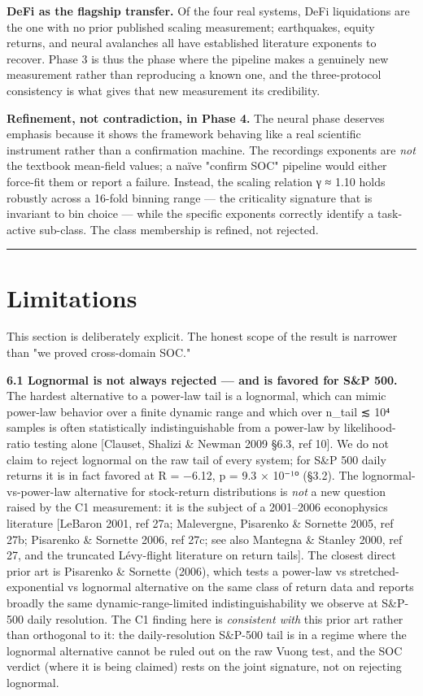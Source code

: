 \documentclass[
  11pt]{article}
\begin{document}
\textbf{DeFi as the flagship transfer.} Of the four real systems, DeFi
liquidations are the one with no prior published scaling measurement;
earthquakes, equity returns, and neural avalanches all have established
literature exponents to recover. Phase 3 is thus the phase where the
pipeline makes a genuinely new measurement rather than reproducing a
known one, and the three-protocol consistency is what gives that new
measurement its credibility.

\textbf{Refinement, not contradiction, in Phase 4.} The neural phase
deserves emphasis because it shows the framework behaving like a real
scientific instrument rather than a confirmation machine. The
recording\textquotesingle s exponents are \emph{not} the textbook
mean-field values; a naïve "confirm SOC" pipeline would either force-fit
them or report a failure. Instead, the scaling relation γ ≈ 1.10 holds
robustly across a 16-fold binning range --- the criticality signature
that is invariant to bin choice --- while the specific exponents
correctly identify a task-active sub-class. The class membership is
refined, not rejected.

\begin{center}\rule{0.5\linewidth}{0.5pt}\end{center}

\section{Limitations}\label{sec:6}

This section is deliberately explicit. The honest scope of the result is
narrower than "we proved cross-domain SOC."

\textbf{6.1 Lognormal is not always rejected --- and is favored for S\&P
500.} The hardest alternative to a power-law tail is a lognormal, which
can mimic power-law behavior over a finite dynamic range and which over
n\_tail ≲ 10⁴ samples is often statistically indistinguishable from a
power-law by likelihood-ratio testing alone {[}Clauset, Shalizi \&
Newman 2009 §6.3, ref 10{]}. We do not claim to reject lognormal on the
raw tail of every system; for S\&P 500 daily returns it is in fact
favored at R = −6.12, p = 9.3 × 10⁻¹⁰ (§3.2). The lognormal-vs-power-law
alternative for stock-return distributions is \emph{not} a new question
raised by the C1 measurement: it is the subject of a 2001--2006
econophysics literature {[}LeBaron 2001, ref 27a; Malevergne, Pisarenko
\& Sornette 2005, ref 27b; Pisarenko \& Sornette 2006, ref 27c; see also
Mantegna \& Stanley 2000, ref 27, and the truncated Lévy-flight
literature on return tails{]}. The closest direct prior art is Pisarenko
\& Sornette (2006), which tests a power-law vs stretched-exponential vs
lognormal alternative on the same class of return data and reports
broadly the same dynamic-range-limited indistinguishability we observe
at S\&P-500 daily resolution. The C1 finding here is \emph{consistent
with} this prior art rather than orthogonal to it: the daily-resolution
S\&P-500 tail is in a regime where the lognormal alternative cannot be
ruled out on the raw Vuong test, and the SOC verdict (where it is being
claimed) rests on the joint signature, not on rejecting lognormal.
\end{document}
